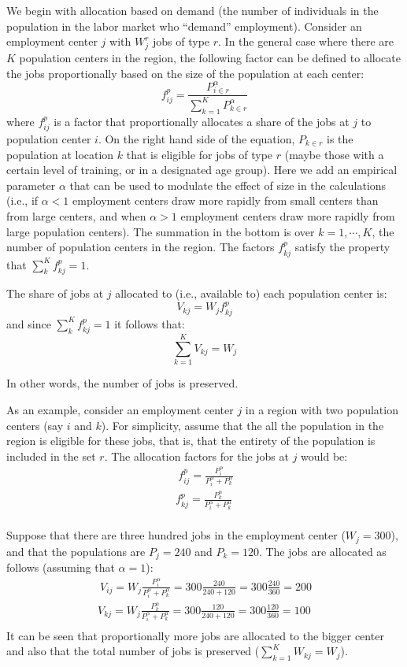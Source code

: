 \documentclass[]{elsarticle} %
\begin{document}
We begin with allocation based on demand (the number of individuals in
the population in the labor market who ``demand'' employment). Consider
an employment center \(j\) with \(W_j^r\) jobs of type \(r\). In the
general case where there are \(K\) population centers in the region, the
following factor can be defined to allocate the jobs proportionally
based on the size of the population at each center: \[
f^p_{ij} = \frac{P_{i\in r}^\alpha}{\sum_{k=1}^K P_{k\in r}^\alpha}
\] \noindent where \(f^p_{ij}\) is a factor that proportionally
allocates a share of the jobs at \(j\) to population center \(i\). On
the right hand side of the equation, \(P_{k\in r}\) is the population at
location \(k\) that is eligible for jobs of type \(r\) (maybe those with
a certain level of training, or in a designated age group). Here we add
an empirical parameter \(\alpha\) that can be used to modulate the
effect of size in the calculations (i.e., if \(\alpha <1\) employment
centers draw more rapidly from small centers than from large centers,
and when \(\alpha>1\) employment centers draw more rapidly from large
population centers). The summation in the bottom is over
\(k=1,\cdots,K\), the number of population centers in the region. The
factors \(f_{kj}^p\) satisfy the property that
\(\sum_k^{K} f^p_{kj} = 1\).

The share of jobs at \(j\) allocated to (i.e., available to) each
population center is: \[
V_{kj} = W_jf^p_{kj}
\] \noindent and since \(\sum_k^{K} f^p_{kj} = 1\) it follows that: \[
\sum_{k=1}^K V_{kj} = W_j 
\]

In other words, the number of jobs is preserved.

As an example, consider an employment center \(j\) in a region with two
population centers (say \(i\) and \(k\)). For simplicity, assume that
the all the population in the region is eligible for these jobs, that
is, that the entirety of the population is included in the set \(r\).
The allocation factors for the jobs at \(j\) would be: \[
\begin{array}{l}\
f^p_{ij} = \frac{P_i ^\alpha}{P_i^\alpha + P_k^\alpha}\\
f^p_{kj} = \frac{P_k^\alpha}{P_i^\alpha + P_k^\alpha}\\
\end{array}
\]

Suppose that there are three hundred jobs in the employment center
(\(W_j = 300\)), and that the populations are \(P_j=240\) and
\(P_k=120\). The jobs are allocated as follows (assuming that
\(\alpha=1\)): \[
\begin{array}{l}\
V_{ij} = W_j\frac{P_i^\alpha}{P_i^\alpha + P_k^\alpha} = 300\frac{240}{240 + 120} = 300\frac{240}{360} = 200\\
V_{kj} = W_j\frac{P_k^\alpha}{P_i^\alpha + P_k^\alpha} = 300\frac{120}{240 + 120} = 300\frac{120}{360} = 100 \\
\end{array}
\] It can be seen that proportionally more jobs are allocated to the
bigger center and also that the total number of jobs is preserved
(\(\sum_{k=1}^K W_{kj} = W_j\)).
\end{document}
